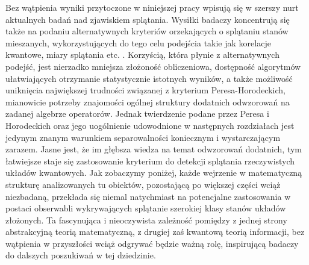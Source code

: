 Bez wątpienia wyniki przytoczone w niniejszej pracy wpisują się w szerszy nurt
aktualnych badań nad zjawiskiem splątania.
Wysiłki badaczy koncentrują się także na podaniu alternatywnych kryteriów
orzekających o splątaniu stanów mieszanych,
wykorzystujących do tego celu podejścia takie jak korelacje kwantowe,
miary splątania etc. 
\cite{modi2010unified,ollivier2001quantum}.
Korzyścią, która płynie z alternatywnych podejść,
jest nierzadko mniejsza złożoność obliczeniowa,
dostępność algorytmów ułatwiających otrzymanie statystycznie istotnych wyników,
a także możliwość uniknięcia największej trudności związanej z kryterium
Peresa-Horodeckich,
mianowicie potrzeby znajomości ogólnej struktury dodatnich odwzorowań
na zadanej algebrze operatorów.
Jednak twierdzenie podane przez Peresa i Horodeckich oraz 
jego uogólnienie udowodnione w następnych rozdziałach
jest jedynym znanym warunkiem separowalności 
koniecznym i wystarczającym zarazem.
Jasne jest,
że im głębsza wiedza na temat odwzorowań dodatnich,
tym łatwiejsze staje się zastosowanie kryterium do detekcji splątania
rzeczywistych układów kwantowych.
Jak zobaczymy poniżej,
każde wejrzenie w matematyczną strukturę analizowanych tu obiektów,
pozostającą po większej części wciąż niezbadaną,
przekłada się niemal natychmiast na potencjalne zastosowania w postaci
obserwabli wykrywających splątanie szerokiej klasy stanów układów złożonych.
Ta fascynująca i nieoczywista zależność pomiędzy z jednej strony abstrakcyjną
teorią matematyczną,
z drugiej zaś kwantową teorią informacji,
bez wątpienia w przyszłości wciąż odgrywać będzie ważną rolę,
inspirującą badaczy do dalszych poszukiwań w tej dziedzinie.


